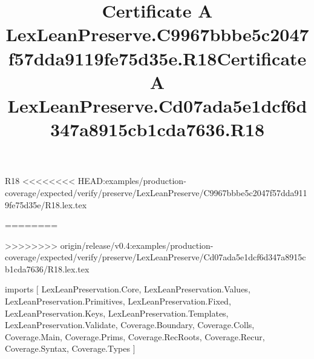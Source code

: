 \begin{lexlean}{R18}
<<<<<<<< HEAD:examples/production-coverage/expected/verify/preserve/LexLeanPreserve/C9967bbbe5c2047f57dda9119fe75d35e/R18.lex.tex
\title{Certificate A LexLeanPreserve.C9967bbbe5c2047f57dda9119fe75d35e.R18}
========
\title{Certificate A LexLeanPreserve.Cd07ada5e1dcf6d347a8915cb1cda7636.R18}
>>>>>>>> origin/release/v0.4:examples/production-coverage/expected/verify/preserve/LexLeanPreserve/Cd07ada5e1dcf6d347a8915cb1cda7636/R18.lex.tex
\begin{coremodule}
imports [
  LexLeanPreservation.Core,
  LexLeanPreservation.Values,
  LexLeanPreservation.Primitives,
  LexLeanPreservation.Fixed,
  LexLeanPreservation.Keys,
  LexLeanPreservation.Templates,
  LexLeanPreservation.Validate,
  Coverage.Boundary,
  Coverage.Colls,
  Coverage.Main,
  Coverage.Prims,
  Coverage.RecRoots,
  Coverage.Recur,
  Coverage.Syntax,
  Coverage.Types
]


\end{coremodule}
\end{lexlean}
